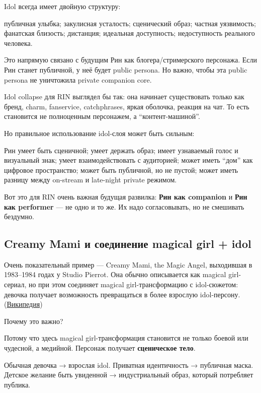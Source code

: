 Idol всегда имеет двойную структуру:

публичная улыбка; закулисная усталость; сценический образ; частная
уязвимость; фанатская близость; дистанция; идеальная доступность;
недоступность реального человека.

Это напрямую связано с будущим Рин как блогера/\hspace{0pt}стримерского персонажа.
Если Рин станет публичной, у неё будет public persona. Но важно, чтобы
эта public persona не уничтожила private companion core.

Idol collapse для RIN выглядел бы так: она начинает существовать только
как бренд, charm, fanservice, catchphrases, яркая оболочка, реакция на
чат. То есть становится не полноценным персонажем, а
``контент-машиной''.

Но правильное использование idol-слоя может быть сильным:

Рин умеет быть сценичной; умеет держать образ; имеет узнаваемый голос и
визуальный знак; умеет взаимодействовать с аудиторией; может иметь
``дом'' как цифровое пространство; может быть публичной, но не пустой;
может иметь разницу между on-stream и late-night private режимом.

Вот это для RIN очень важная будущая развилка: \textbf{Рин как
companion} и \textbf{Рин как performer} --- не одно и то же. Их надо
согласовывать, но не смешивать бездумно.

\subsection*{Creamy Mami и соединение magical girl + idol}

Очень показательный пример --- Creamy Mami, the Magic Angel, выходившая
в 1983--1984 годах у Studio Pierrot. Она обычно описывается как magical
girl-сериал, но при этом соединяет magical girl-трансформацию с
idol-сюжетом: девочка получает возможность превращаться в более взрослую
idol-персону.
(\href{https://en.wikipedia.org/wiki/Creamy_Mami\%2C_the_Magic_Angel?utm_source=chatgpt.com}{Википедия})

Почему это важно?

Потому что здесь magical girl-трансформация становится не только боевой
или чудесной, а медийной. Персонаж получает \textbf{сценическое тело}.

Обычная девочка → взрослая idol. Приватная идентичность → публичная
маска. Детское желание быть увиденной → индустриальный образ, который
потребляет публика.

